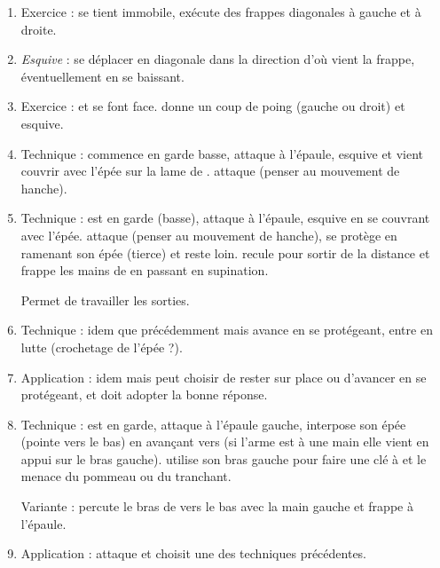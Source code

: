 \begin{enumerate}
	\item Exercice : \D se tient immobile, \A exécute des frappes diagonales à gauche et à droite.
	
	\item \emph{Esquive} : se déplacer en diagonale dans la direction d'où vient la frappe, éventuellement en se baissant.

	\item Exercice : \A et \D se font face.
		\A donne un coup de poing (gauche ou droit) et \D esquive.
	
	\item Technique : \D commence en garde basse, \A attaque à l'épaule, \D esquive et vient couvrir avec l'épée sur la lame de \A.
	\D attaque \A (penser au mouvement de hanche).
	
	\item Technique : \D est en garde (basse), \A attaque à l'épaule, \D esquive en se couvrant avec l'épée.
	\D attaque \A (penser au mouvement de hanche), \A se protège en ramenant son épée (tierce) et reste loin.
	\D recule pour sortir de la distance et frappe les mains de \A en passant en supination.
	
	Permet de travailler les sorties.
	
	\item Technique : idem que précédemment mais \A avance en se protégeant, \D entre en lutte (crochetage de l'épée ?).
	
	\item Application : idem mais \A peut choisir de rester sur place ou d'avancer en se protégeant, et \D doit adopter la bonne réponse.
	
	\item Technique : \D est en garde, \A attaque à l'épaule gauche, \D interpose son épée (pointe vers le bas) en avançant vers \A (si l'arme est à une main elle vient en appui sur le bras gauche).
	\D utilise son bras gauche pour faire une clé à \A et le menace du pommeau ou du tranchant.
	
	Variante : \D percute le bras de \A vers le bas avec la main gauche et frappe à l'épaule.
	
	\item Application : \A attaque et \D choisit une des techniques précédentes.
\end{enumerate}



